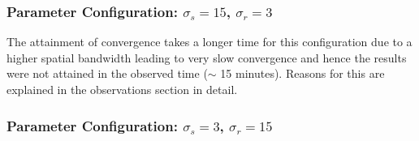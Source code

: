 \documentclass{article}
\begin{document}
\subsubsection{\texorpdfstring{Parameter Configuration: $\sigma_s = 15$, $\sigma_r = 3$}{Parameter Configuration: sigma\_s = 15, sigma\_r = 3}}

The attainment of convergence takes a longer time for this configuration due to a higher spatial bandwidth leading to very slow convergence and hence the results were not attained in the observed time ($\sim$ 15 minutes). Reasons for this are explained in the observations section in detail.

\subsubsection{\texorpdfstring{Parameter Configuration: $\sigma_s = 3$, $\sigma_r = 15$}{Parameter Configuration: sigma\_s = 3, sigma\_r = 15}}
\end{document}
